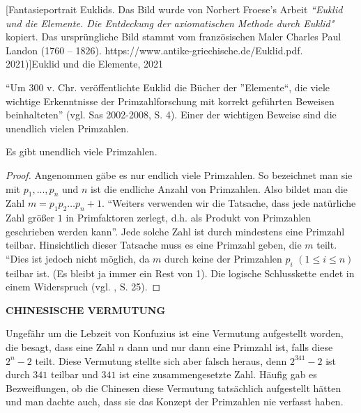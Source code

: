 \begin{minipage}[r]{0.3\linewidth}
  [Fantasieportrait Euklids. Das Bild wurde von Norbert Froese's Arbeit \textit{``Euklid und die Elemente. Die Entdeckung der axiomatischen Methode durch Euklid"} kopiert. Das ursprüngliche Bild stammt vom französischen Maler Charles Paul Landon (1760 – 1826). https://www.antike-griechische.de/Euklid.pdf. 2021)]{Euklid und die Elemente, 2021}
  \label{fig:sample_figure}
\end{minipage}
\vspace{.3cm}

``Um 300 v. Chr. veröffentlichte Euklid die Bücher der
”Elemente“, die viele wichtige Erkenntnisse der Primzahlforschung
mit korrekt geführten Beweisen beinhalteten'' (vgl. Sas
2002-2008, S. 4). Einer der wichtigen Beweise sind die
unendlich vielen Primzahlen.

\begin{mythm}
Es gibt unendlich viele Primzahlen.
\end{mythm}
\begin{proof}
Angenommen gäbe es nur endlich viele Primzahlen.
So bezeichnet man sie mit $p_1 ,...,p_n$ und $n$
ist die endliche Anzahl von Primzahlen.
Also bildet man die Zahl $m = p_1 p_2 \dots p_n + 1$.
``Weiters verwenden wir die Tatsache, dass jede 
natürliche Zahl größer $1$ in Primfaktoren zerlegt, 
d.h. als Produkt von Primzahlen geschrieben werden kann''.
Jede solche Zahl ist durch mindestens eine Primzahl teilbar.
Hinsichtlich dieser Tatsache muss es eine Primzahl geben, 
die $m$ teilt. ``Dies ist jedoch nicht möglich, da $m$
durch keine der Primzahlen $p_i$ $(1 \leq i \leq n)$ teilbar
ist. (Es bleibt ja immer ein Rest von 1). Die logische
Schlusskette endet in einem Widerspruch
(vgl. \cite{schichlsteinbauer}, S. 25).
\end{proof}

\newpage


\textbf{CHINESISCHE VERMUTUNG}

Ungefähr um die Lebzeit von Konfuzius ist eine Vermutung
aufgestellt worden, die besagt, dass eine Zahl $n$ dann
und nur dann eine Primzahl ist, falls diese $2^{n} - 2$
teilt. Diese Vermutung stellte sich aber falsch heraus,
denn $2^{341} - 2$ ist durch $341$ teilbar und $341$ ist
eine zusammengesetzte Zahl. Häufig gab es Bezweiflungen,
ob die Chinesen diese Vermutung tatsächlich aufgestellt
hätten und man dachte auch, dass sie das Konzept der
Primzahlen nie verfasst haben.

